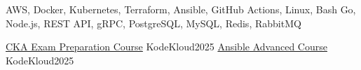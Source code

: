 \begin{cvskills}
    {AWS, Docker, Kubernetes, Terraform, Ansible, GitHub Actions, Linux, Bash}
    {Go, Node.js, REST API, gRPC, PostgreSQL, MySQL, Redis, RabbitMQ}
\end{cvskills}

\begin{cvhonors}
  \cvhonor
    {\href{https://learn.kodekloud.com/certificate/02b28ebc-41eb-4991-83d3-cd6f230cf00d}{CKA Exam Preparation Course}}
    {KodeKloud}{}{2025}
  \cvhonor
    {\href{https://learn.kodekloud.com/certificate/29528ebb-1f53-4bdb-bdd0-9fdcccd07fa3}{Ansible Advanced Course}}
    {KodeKloud}{}{2025}
\end{cvhonors}
